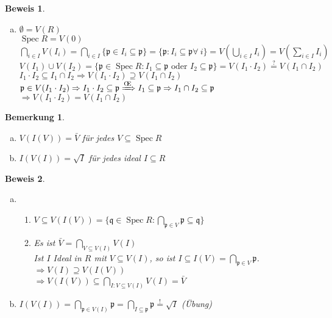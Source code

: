 \documentclass[paper = A4, fontsize=12pt, numbers=noendperiod, chapterprefix=true]{scrbook}
\theoremstyle{break}
\newtheorem{Bem}[Def]{Bemerkung}
\theoremstyle{nonumberbreak}
\newtheorem{bew}{Beweis}
\theoremstyle{nonumberplain}
\newcommand{\quot}[1]{\textrm{\glqq}{#1}\textrm{\grqq}}
\newenvironment{twosidedproof}{\begin{enumerate}[\quot{$\Rightarrow$}:]}{\end{enumerate}}
\newcommand{\proofsubseteq}{\item[\quot{$\subseteq$}:]}
\newcommand{\proofsupseteq}{\item[\quot{$\supseteq$}:]}
\DeclareMathOperator{\Spec}{Spec}
\newcommand{\p}{\mathfrak{p}} %
\newcommand{\q}{\mathfrak{q}} %
\renewcommand{\OE}{O\!\!E~}
\begin{document}
\begin{bew}\begin{enumerate}[a)]\item[c)]
$\emptyset = V(R)$\\
$\Spec R = V(0)$\\
$\bigcap\limits_{i\in I} V(I_i) = \bigcap\limits_{i\in I}\{\p \in I_i \subseteq \p\} = \{\p: I_i \subseteq \p \forall\  i\} = V(\bigcup\limits_{i\in I} I_i) = V(\sum\limits_{i\in I} I_i)$\\
$V(I_1)\cup V(I_2) = \{\p \in \Spec R: I_1 \subseteq \p \text{ oder } I_2 \subseteq \p\} = V(I_1\cdot I_2) \overset{?}{=} V(I_1\cap I_2)$\\
\hspace*{10mm} $I_1\cdot I_2 \subseteq I_1 \cap I_2 \Rightarrow V(I_1\cdot I_2) \supseteq V(I_1\cap I_2)$\\
\hspace*{10mm} $\p \in V(I_1\cdot I_2) \Rightarrow I_1\cdot I_2 \subseteq \p \xRightarrow{\text{\OE}} I_1 \subseteq \p \Rightarrow I_1\cap I_2 \subseteq \p$\\
$\Rightarrow V(I_1\cdot I_2) = V(I_1\cap I_2)$
\end{enumerate}\end{bew}

\begin{Bem}\begin{enumerate}[a)]
\item
  $V(I(V)) = \bar{V}$ f\"ur jedes $V\subseteq \Spec R$
\item
  $I(V(I)) = \sqrt{I}$ f\"ur jedes ideal $I\subseteq R$
\end{enumerate}\end{Bem}

\begin{bew}\begin{enumerate}[a)]
\item
  \begin{twosidedproof}
  \proofsupseteq
    $V\subseteq V(I(V)) = \{\q \in \Spec R: \bigcap\limits_{\p \in V} \p \subseteq \q \}$
  \proofsubseteq
    Es ist $\bar{V} = \bigcap\limits_{V\subseteq V(I)}V(I)$\\
    Ist $I$ Ideal in $R$ mit $V\subseteq V(I)$, so ist $I\subseteq I(V) = \bigcap\limits_{\p \in V} \p$.\\
    $\Rightarrow V(I) \supseteq V(I(V))$\\
    $\Rightarrow V(I(V)) \subseteq \bigcap\limits_{I:V\subseteq V(I)} V(I) = \bar{V}$
  \end{twosidedproof}
\item
  $I(V(I)) = \bigcap\limits_{\p \in V(I)} \p = \bigcap\limits_{I\subseteq \p} \p \overset{!}{=} \sqrt{I}$ (\"Ubung)
\end{enumerate}\end{bew}
\end{document}
